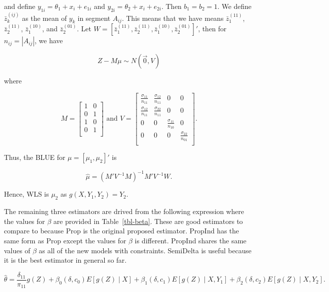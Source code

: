 \documentclass[
  letterpaper,
  DIV=11,
  numbers=noendperiod]{scrartcl}
\begin{document}
and define \(y_{1i} = \theta_1 + x_i + e_{1i}\) and
\(y_{2i} = \theta_2 + x_i + e_{2i}\). Then \(b_1 = b_2 = 1\). We define
\(\bar z_k^{(ij)}\) as the mean of \(y_k\) in segment \(A_{ij}\). This
means that we have means \(\bar z_1^{(11)}\), \(\bar z_2^{(11)}\),
\(\bar z_1^{(10)}\), and \(\bar z_2^{(01)}\). Let
\(W = [\bar z_1^{(11)}, \bar z_2^{(11)}, \bar z_1^{(10)}, \bar z_2^{(01)}]'\),
then for \(n_{ij} = |A_{ij}|\), we have

\[Z - M \mu \sim N(\vec 0, V)\]

where

\[M = 
  \begin{bmatrix}
    1 & 0 \\
    0 & 1 \\
    1 & 0 \\
    0 & 1 \\
  \end{bmatrix}
  \text{ and }
  V = 
  \begin{bmatrix}
    \frac{\sigma_{11}}{n_{11}} & \frac{\sigma_{12}}{n_{11}} & 0 & 0 \\
    \frac{\sigma_{12}}{n_{11}} & \frac{\sigma_{22}}{n_{11}} & 0 & 0 \\
    0 & 0 & \frac{\sigma_{11}}{n_{10}} & 0 \\
    0 & 0 & 0 & \frac{\sigma_{22}}{n_{01}} \\
  \end{bmatrix}.
\]

Thus, the BLUE for \(\mu = [\mu_1, \mu_2]'\) is

\[\hat \mu = (M' V^{-1} M)^{-1} M' V^{-1} W.\]

Hence, WLS is \(\mu_2\) as \(g(X, Y_1, Y_2) = Y_2\).

The remaining three estimators are drived from the following expression
where the values for \(\beta\) are provided in Table~\ref{tbl-beta}.
These are good estimators to compare to because Prop is the original
proposed estimator. PropInd has the same form as Prop except the values
for \(\beta\) is different. PropInd shares the same values of \(\beta\)
as all of the new models with constraints. SemiDelta is useful because
it is the best estimator in general so far.

\[
\hat \theta = \frac{\delta_{11}}{\pi_{11}}g(Z) + 
\beta_0(\delta, c_0)E[g(Z) \mid X] + 
\beta_1(\delta, c_1)E[g(Z) \mid X, Y_1] + 
\beta_2(\delta, c_2) E[g(Z)
\mid X, Y_2].
\]
\end{document}
